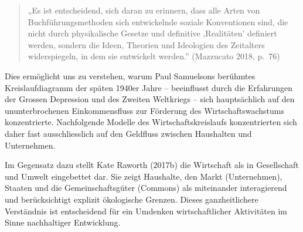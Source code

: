 \documentclass[
  nswissgerman,
  a4paper,
  openany]{book}
\begin{document}
\begin{quote}
„Es ist entscheidend, sich daran zu erinnern, dass alle Arten von
Buchführungsmethoden sich entwickelnde soziale Konventionen sind, die
nicht durch physikalische Gesetze und definitive ‚Realitäten' definiert
werden, sondern die Ideen, Theorien und Ideologien des Zeitalters
widerspiegeln, in dem sie entwickelt werden.'' (Mazzucato 2018, p.~76)
\end{quote}

Dies ermöglicht uns zu verstehen, warum Paul Samuelsons berühmtes
Kreislaufdiagramm der späten 1940er Jahre -- beeinflusst durch die
Erfahrungen der Grossen Depression und des Zweiten Weltkriegs -- sich
hauptsächlich auf den ununterbrochenen Einkommensfluss zur Förderung des
Wirtschaftswachstums konzentrierte. Nachfolgende Modelle des
Wirtschaftskreislaufs konzentrierten sich daher fast ausschliesslich auf
den Geldfluss zwischen Haushalten und Unternehmen.

Im Gegensatz dazu stellt Kate Raworth (2017b) die Wirtschaft als in
Gesellschaft und Umwelt eingebettet dar. Sie zeigt Haushalte, den Markt
(Unternehmen), Staaten und die Gemeinschaftsgüter (Commons) als
miteinander interagierend und berücksichtigt explizit ökologische
Grenzen. Dieses ganzheitlichere Verständnis ist entscheidend für ein
Umdenken wirtschaftlicher Aktivitäten im Sinne nachhaltiger Entwicklung.
\end{document}
